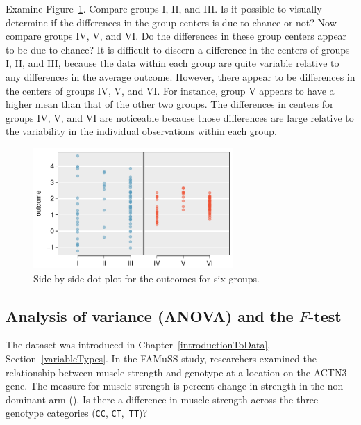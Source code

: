\begin{examplewrap}
\begin{nexample}{Examine Figure~\ref{toyANOVA}. Compare groups I, II, and III. Is it possible to visually determine if the differences in the group centers is due to chance or not? Now compare groups IV, V, and VI. Do the differences in these group centers appear to be due to chance?}		
It is difficult to discern a difference in the centers of groups I, II, and III, because the data within each group are quite variable relative to any differences in the average outcome. However, there appear to be differences in the centers of groups IV, V, and VI. For instance, group V appears to have a higher mean than that of the other two groups. The differences in centers for groups IV, V, and VI are noticeable because those differences are large relative to the variability in the individual observations within each group.
\end{nexample}
\end{examplewrap}

\begin{figure}[h]
	\centering
	\includegraphics[width=0.68\textwidth]{ch_inference_for_means_oi_biostat/figures/toyANOVA/toyANOVA}
	\caption{Side-by-side dot plot for the outcomes for six groups.}
	\label{toyANOVA}
\end{figure}		


\textD{\newpage}


\subsection{Analysis of variance (ANOVA) and the $F$-test}
\label{ANOVASection}

\noindent%
The  dataset was introduced in Chapter~\ref{introductionToData}, Section~\ref{variableTypes}. In the FAMuSS study, researchers examined the relationship between muscle strength and genotype at a location on the ACTN3 gene. The measure for muscle strength is percent change in strength in the non-dominant arm (). Is there a difference in muscle strength across the three genotype categories (\texttt{CC}, \texttt{CT},~\texttt{TT})?


